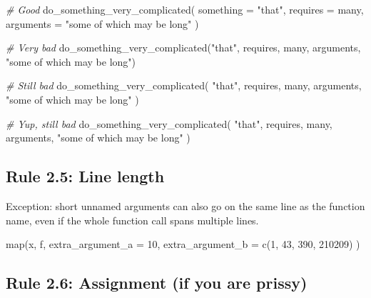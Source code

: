 \documentclass[
  letterpaper,
  DIV=11,
  numbers=noendperiod]{scrreprt}
\newenvironment{Shaded}{\begin{snugshade}}{\end{snugshade}}
\newcommand{\AttributeTok}[1]{\textcolor[rgb]{0.49,0.56,0.16}{#1}}
\newcommand{\CommentTok}[1]{\textcolor[rgb]{0.38,0.63,0.69}{\textit{#1}}}
\newcommand{\DecValTok}[1]{\textcolor[rgb]{0.25,0.63,0.44}{#1}}
\newcommand{\FunctionTok}[1]{\textcolor[rgb]{0.02,0.16,0.49}{#1}}
\newcommand{\NormalTok}[1]{\textcolor[rgb]{0.00,0.44,0.13}{#1}}
\newcommand{\StringTok}[1]{\textcolor[rgb]{0.25,0.44,0.63}{#1}}
\begin{document}
\begin{Shaded}
\begin{Highlighting}[]
\CommentTok{\# Good}
\FunctionTok{do\_something\_very\_complicated}\NormalTok{(}
  \AttributeTok{something =} \StringTok{"that"}\NormalTok{,}
  \AttributeTok{requires =}\NormalTok{ many,}
  \AttributeTok{arguments =} \StringTok{"some of which may be long"}
\NormalTok{)}

\CommentTok{\# Very bad}
\FunctionTok{do\_something\_very\_complicated}\NormalTok{(}\StringTok{"that"}\NormalTok{, requires, many, arguments, }\StringTok{"some of which may be long"}\NormalTok{)}

\CommentTok{\# Still bad}
\FunctionTok{do\_something\_very\_complicated}\NormalTok{(}
  \StringTok{"that"}\NormalTok{, requires, many,}
\NormalTok{  arguments,}
  \StringTok{"some of which may be long"}
\NormalTok{)}

\CommentTok{\# Yup, still bad}
\FunctionTok{do\_something\_very\_complicated}\NormalTok{(}
  \StringTok{"that"}\NormalTok{, requires, many, arguments,}
  \StringTok{"some of which may be long"}
\NormalTok{)}
\end{Highlighting}
\end{Shaded}

\hypertarget{rule-2.5-line-length}{%
\subsection{Rule 2.5: Line length}\label{rule-2.5-line-length}}

Exception: short unnamed arguments can also go on the same line as the
function name, even if the whole function call spans multiple lines.

\begin{Shaded}
\begin{Highlighting}[]
\FunctionTok{map}\NormalTok{(x, f,}
  \AttributeTok{extra\_argument\_a =} \DecValTok{10}\NormalTok{,}
  \AttributeTok{extra\_argument\_b =} \FunctionTok{c}\NormalTok{(}\DecValTok{1}\NormalTok{, }\DecValTok{43}\NormalTok{, }\DecValTok{390}\NormalTok{, }\DecValTok{210209}\NormalTok{)}
\NormalTok{)}
\end{Highlighting}
\end{Shaded}

\hypertarget{rule-2.6-assignment-if-you-are-prissy}{%
\subsection{Rule 2.6: Assignment (if you are
prissy)}\label{rule-2.6-assignment-if-you-are-prissy}}
\end{document}
